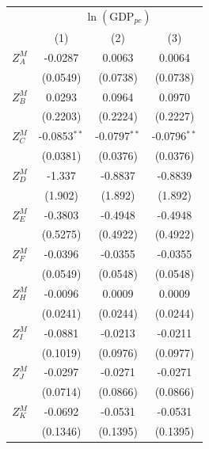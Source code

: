 \begingroup
\centering
\begin{tabular}{lccc}
   \toprule
    & \multicolumn{3}{c}{$\ln(\text{GDP}_{pc})$}\\
                        & (1)            & (2)             & (3)\\  
   \midrule 
   $Z^{M}_A$            & -0.0287        & 0.0063          & 0.0064\\   
                        & (0.0549)       & (0.0738)        & (0.0738)\\   
   $Z^{M}_B$            & 0.0293         & 0.0964          & 0.0970\\   
                        & (0.2203)       & (0.2224)        & (0.2227)\\   
   $Z^{M}_C$            & -0.0853$^{**}$ & -0.0797$^{**}$  & -0.0796$^{**}$\\   
                        & (0.0381)       & (0.0376)        & (0.0376)\\   
   $Z^{M}_D$            & -1.337         & -0.8837         & -0.8839\\   
                        & (1.902)        & (1.892)         & (1.892)\\   
   $Z^{M}_E$            & -0.3803        & -0.4948         & -0.4948\\   
                        & (0.5275)       & (0.4922)        & (0.4922)\\   
   $Z^{M}_F$            & -0.0396        & -0.0355         & -0.0355\\   
                        & (0.0549)       & (0.0548)        & (0.0548)\\   
   $Z^{M}_H$            & -0.0096        & 0.0009          & 0.0009\\   
                        & (0.0241)       & (0.0244)        & (0.0244)\\   
   $Z^{M}_I$            & -0.0881        & -0.0213         & -0.0211\\   
                        & (0.1019)       & (0.0976)        & (0.0977)\\   
   $Z^{M}_J$            & -0.0297        & -0.0271         & -0.0271\\   
                        & (0.0714)       & (0.0866)        & (0.0866)\\   
   $Z^{M}_K$            & -0.0692        & -0.0531         & -0.0531\\   
                        & (0.1346)       & (0.1395)        & (0.1395)\\   

\end{tabular}
